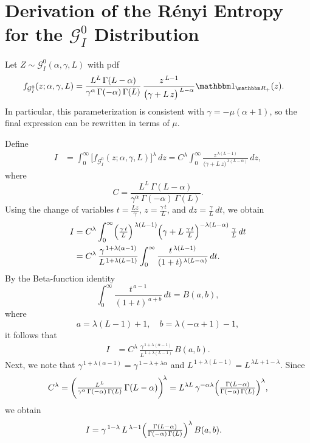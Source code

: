 \documentclass[
  letterpaper,
  11pt,
  english,
  doublespacing,
  headsepline,
  consistentlayout,
  oneside,
  openany]{MastersDoctoralThesis}
\begin{document}
\section{\texorpdfstring{Derivation of the Rényi Entropy for the
\texorpdfstring{$\mathcal{G}^0_I$}{G0I}
Distribution}{Derivation of the Rényi Entropy for the  Distribution}}\label{derivation-of-the-ruxe9nyi-entropy-for-the-distribution}

\medskip

\noindent Let \(Z \sim \mathcal{G}^0_I(\alpha, \gamma, L)\) with pdf
\begin{align*}
f_{\mathcal{G}^0_I}(z; \alpha, \gamma, L) 
&= \frac{L^L\,\Gamma(L-\alpha)}{\gamma^{\alpha}\,\Gamma(-\alpha)\,\Gamma(L)}
   \,\frac{z^{\,L-1}}{\bigl(\gamma + L\,z\bigr)^{\,L-\alpha}}\mathbbm 1_{\mathbbm R_+}(z). \label{E:gamma1}
\end{align*} In particular, this parameterization is consistent with
\(\gamma = -\mu(\alpha + 1)\), so the final expression can be rewritten
in terms of \(\mu\).

\medskip

\noindent Define \begin{align*}
I 
&= \int_{0}^{\infty} \bigl[f_{\mathcal{G}^0_I}(z; \alpha, \gamma, L)\bigr]^\lambda \,dz
= C^\lambda 
  \int_{0}^{\infty} 
    \frac{z^{\,\lambda(L - 1)}}
         {\bigl(\gamma + L\,z\bigr)^{\,\lambda(L - \alpha)}} 
  \,dz,
\end{align*} where \[
C 
= \frac{L^L\,\Gamma(L - \alpha)}{\gamma^\alpha\,\Gamma(-\alpha)\,\Gamma(L)}.
\] Using the change of variables \(t = \tfrac{Lz}{\gamma}\),
\(z = \tfrac{\gamma\,t}{L}\), and \(dz = \tfrac{\gamma}{L}\,dt\), we
obtain \begin{align*}
I 
&= C^\lambda
   \int_{0}^{\infty}
     \Bigl(\tfrac{\gamma\,t}{L}\Bigr)^{\,\lambda(L - 1)}
     \Bigl(\gamma + L\,\tfrac{\gamma\,t}{L}\Bigr)^{-\lambda(L - \alpha)}
     \,\tfrac{\gamma}{L}\,dt
\\
&= C^\lambda 
   \,\frac{\gamma^{\,1+\lambda(\alpha - 1)}}{L^{\,1+\lambda(L - 1)}}
   \int_{0}^{\infty}
     \frac{t^{\,\lambda(L - 1)}}
          {(1 + t)^{\,\lambda(L - \alpha)}}
   \,dt.
\end{align*} By the Beta-function identity \[
\int_{0}^{\infty} \frac{t^{\,a - 1}}{(1 + t)^{\,a + b}} \, dt 
= B(a,b),
\] where \[
a = \lambda(L - 1) + 1,
\quad
b = \lambda(-\alpha + 1) - 1,
\] it follows that \begin{align*}
I 
&= C^\lambda \,\frac{\gamma^{\,1+\lambda(\alpha - 1)}}{L^{\,1+\lambda(L - 1)}}
   \,B(a,b).
\end{align*} Next, we note that
\(\gamma^{\,1 + \lambda(\alpha - 1)} = \gamma^{\,1 - \lambda + \lambda\alpha}\)
and \(L^{\,1 + \lambda(L - 1)} = L^{\,\lambda L + 1 - \lambda}.\) Since
\[
C^\lambda 
= \biggl(\tfrac{L^L}{\gamma^\alpha\,\Gamma(-\alpha)\,\Gamma(L)}\,\Gamma(L - \alpha)\biggr)^{\!\lambda}
= L^{\lambda L}\,\gamma^{-\alpha \lambda}
  \Bigl(\tfrac{\Gamma(L - \alpha)}{\Gamma(-\alpha)\,\Gamma(L)}\Bigr)^\lambda,
\] we obtain \begin{align*}
I
&= \gamma^{\,1 - \lambda}\,
   L^{\,\lambda - 1}
   \Bigl(\tfrac{\Gamma(L - \alpha)}{\Gamma(-\alpha)\,\Gamma(L)}\Bigr)^\lambda
   \,B(a,b).
\end{align*}
\end{document}
